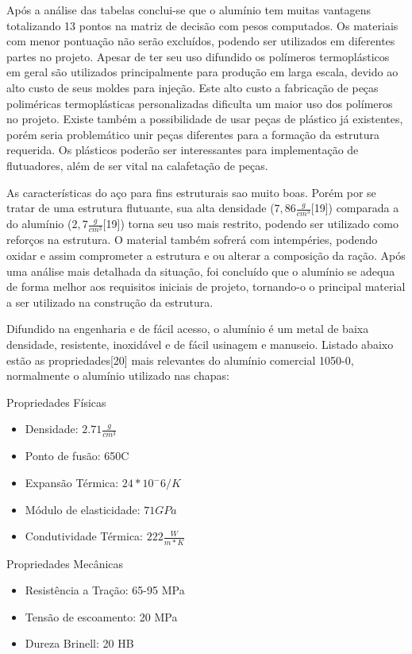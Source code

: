 Após a análise das tabelas conclui-se que o alumínio tem muitas vantagens totalizando 13 pontos na matriz de decisão com pesos computados. Os materiais com menor pontuação não serão excluídos, podendo ser utilizados em diferentes partes no projeto. Apesar de ter seu uso difundido os polímeros termoplásticos em geral são utilizados principalmente para produção em larga escala, devido ao alto custo de seus moldes para injeção. Este alto custo a fabricação de peças poliméricas termoplásticas personalizadas dificulta um maior uso dos polímeros no projeto. Existe também a possibilidade de usar peças de plástico já existentes, porém seria problemático unir peças diferentes para a formação da estrutura requerida. Os plásticos poderão ser interessantes para implementação de flutuadores, além de ser vital na calafetação de peças.

As características do aço para fins estruturais sao muito boas. Porém por se tratar de uma estrutura flutuante, sua alta densidade ($7,86 \frac{g}{cm^3}$[19]) comparada a do alumínio ($2,7 \frac{g}{cm^3}$[19]) torna seu uso mais restrito, podendo ser utilizado como reforços na estrutura. O material também sofrerá com intempéries, podendo oxidar e assim comprometer a estrutura e ou alterar a composição da ração. Após uma análise mais detalhada da situação, foi concluído que o alumínio se adequa de forma melhor aos requisitos iniciais de projeto, tornando-o o principal material a ser utilizado na construção da estrutura.

Difundido na engenharia e de fácil acesso, o alumínio é um metal de baixa densidade, resistente, inoxidável e de fácil usinagem e manuseio. Listado abaixo estão as propriedades[20] mais relevantes do alumínio comercial 1050-0, normalmente o alumínio utilizado nas chapas:

Propriedades Físicas

\begin{itemize}
  \item Densidade: $2.71 \frac{g}{cm^3}$
  \item Ponto de fusão: 650{\degree}C
  \item Expansão Térmica: $24 * 10^-6/K$
  \item Módulo de elasticidade: $71GPa$
  \item Condutividade Térmica: $222\frac{W}{m*K}$
\end{itemize}

Propriedades Mecânicas

\begin{itemize}
  \item Resistência a Tração: 65-95 MPa
  \item Tensão de escoamento: 20 MPa
  \item Dureza Brinell: 20 HB
\end{itemize}

